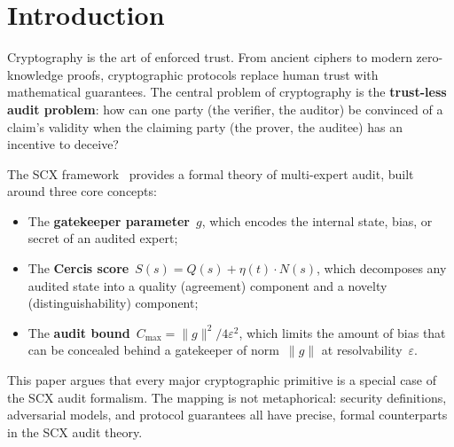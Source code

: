 \documentclass[12pt,a4paper]{article}
\theoremstyle{remark}
\newcommand{\SCX}{\textsf{SCX}}
\newcommand{\Cercis}{\textsf{Cercis}}
\begin{document}
\section{Introduction}
\label{sec:introduction}

Cryptography is the art of enforced trust. From ancient ciphers to modern zero-knowledge proofs, cryptographic protocols replace human trust with mathematical guarantees. The central problem of cryptography is the \textbf{trust-less audit problem}: how can one party (the verifier, the auditor) be convinced of a claim's validity when the claiming party (the prover, the auditee) has an incentive to deceive?

The \SCX{} framework~\cite{scx_theory} provides a formal theory of multi-expert audit, built around three core concepts:
\begin{itemize}[leftmargin=*]
  \item The \textbf{gatekeeper parameter}~$g$, which encodes the internal state, bias, or secret of an audited expert;
  \item The \textbf{\Cercis{} score}~$S(s) = Q(s) + \eta(t) \cdot N(s)$, which decomposes any audited state into a quality (agreement) component and a novelty (distinguishability) component;
  \item The \textbf{audit bound}~$C_{\max} = \|g\|^2 / 4\varepsilon^2$, which limits the amount of bias that can be concealed behind a gatekeeper of norm~$\|g\|$ at resolvability~$\varepsilon$.
\end{itemize}

This paper argues that every major cryptographic primitive is a special case of the \SCX{} audit formalism. The mapping is not metaphorical: security definitions, adversarial models, and protocol guarantees all have precise, formal counterparts in the \SCX{} audit theory.
\end{document}
